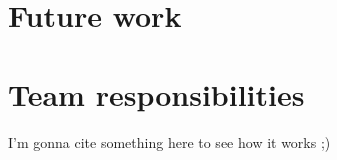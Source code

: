 \documentclass{article} %
\begin{document}
\section{Future work}




\section*{Team responsibilities}

\begin{comment}
Team responsibilities (1 paragraph)
• Who did what
\end{comment}



\begin{comment}
\section*{Files attached}
\begin{itemize}
\item Code
\end{itemize}
\end{comment}

\begin{comment}
\section*{Sources}
\addcontentsline{toc}{section}{Sources}
\begin{itemize}
	\item Bird, Steven, Edward Loper and Ewan Klein (2009), Natural Language Processing with Python. O’Reilly Media Inc.
	\item Author: Ryan Kelly, Home Page: https://pythonhosted.org/pyenchant/
\end{itemize}
\end{comment}

I'm gonna cite something here \cite{greenwade93} to see how it works ;)

\nocite{*}
\printbibliography
\end{document}
